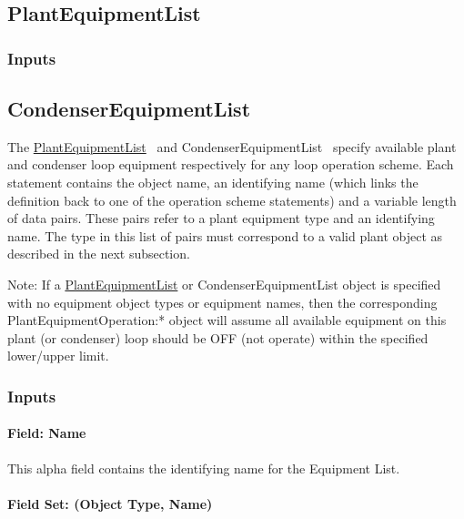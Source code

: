 \subsection{PlantEquipmentList}\label{plantequipmentlist}

\subsubsection{Inputs}\label{inputs-14-009}

\subsection{CondenserEquipmentList}\label{condenserequipmentlist}

The \hyperref[plantequipmentlist]{PlantEquipmentList} ~and CondenserEquipmentList ~specify available plant and condenser loop equipment respectively for any loop operation scheme. Each statement contains the object name, an identifying name (which links the definition back to one of the operation scheme statements) and a variable length of data pairs. These pairs refer to a plant equipment type and an identifying name. The type in this list of pairs must correspond to a valid plant object as described in the next subsection.

Note: If a \hyperref[plantequipmentlist]{PlantEquipmentList} or CondenserEquipmentList object is specified with no equipment object types or equipment names, then the corresponding PlantEquipmentOperation:* object will assume all available equipment on this plant (or condenser) loop should be OFF (not operate) within the specified lower/upper limit.

\subsubsection{Inputs}\label{inputs-15-009}

\paragraph{Field: Name}\label{field-name-8-013}

This alpha field contains the identifying name for the Equipment List.

\paragraph{Field Set: (Object Type, Name)}\label{field-set-object-type-name-1}

